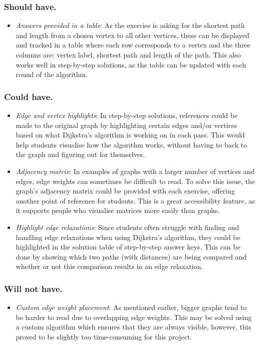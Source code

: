\documentclass{l4proj}
\begin{document}
\subsubsection{Should have.}
\begin{itemize}
	\item
	\emph{Answers provided in a table}: As the exercise is asking for the shortest path and length from a chosen vertex to all other vertices, these can be displayed and tracked in a table where each row corresponds to a vertex and the three columns are: vertex label, shortest path and length of the path. This also works well in step-by-step solutions, as the table can be updated with each round of the algorithm.
\end{itemize}
\subsubsection{Could have.}
\begin{itemize}
	\item
	\emph{Edge and vertex highlights}: In step-by-step solutions, references could be made to the original graph by highlighting certain edges and/or vertices based on what Dijkstra's algorithm is working on in each pass. This would help students visualise how the algorithm works, without having to back to the graph and figuring out for themselves.
	\item
	\emph{Adjacency matrix}: In examples of graphs with a larger number of vertices and edges, edge weights can sometimes be difficult to read. To solve this issue, the graph's adjacency matrix could be provided with each exercise, offering another point of reference for students. This is a great accessibility feature, as it supports people who visualise matrices more easily than graphs.
	\item
	\emph{Highlight edge relaxations}: Since students often struggle with finding and handling edge relaxations \cite{} when using Dijkstra's algorithm, they could be highlighted in the solution table of step-by-step answer keys. This can be done by showing which two paths (with distances) are being compared and whether or not this comparison results in an edge relaxation.
\end{itemize}
\subsubsection{Will not have.}
\begin{itemize}
	\item
	\emph{Custom edge weight placement}: As mentioned earlier, bigger graphs tend to be harder to read due to overlapping edge weights. This may be solved using a custom algorithm which ensures that they are always visible, however, this proved to be slightly too time-consuming for this project.
\end{itemize}
\end{document}
